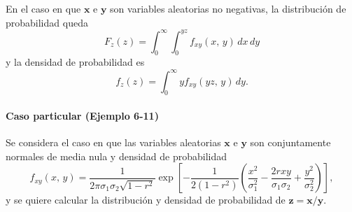 \documentclass[a4paper]{report}
\newcommand{\x}{\mathbf{x}}
\newcommand{\y}{\mathbf{y}}
\newcommand{\z}{\mathbf{z}}
\begin{document}
En el caso en que \(\x\) e \(\y\) son variables aleatorias no negativas, la distribución de probabilidad queda
\[
 F_z(z)=\int_{0}^{\infty}\int_{0}^{yz}f_{xy}(x,\,y)\,dx\,dy
\]
y la densidad de probabilidad es
\[
 f_z(z)=\int_{0}^{\infty}yf_{xy}(yz,\,y)\,dy.
\]

\paragraph{Caso particular (Ejemplo 6-11)} Se considera el caso en que las variables aleatorias \(\x\) e \(\y\) son conjuntamente normales de media nula y densidad de probabilidad
\[
 f_{xy}(x,\,y)=\frac{1}{2\pi\sigma_1\sigma_2\sqrt{1-r^2}}\exp\left[-\frac{1}{2(1-r^2)}\left(\frac{x^2}{\sigma_1^2}-\frac{2rxy}{\sigma_1\sigma_2}+\frac{y^2}{\sigma_2^2}\right)\right],
\]
y se quiere calcular la distribución y densidad de probabilidad de \(\z=\x/\y\).
\end{document}
